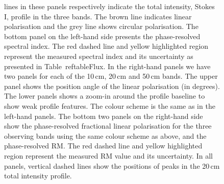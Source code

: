 \documentclass[useAMS,usenatbib]{mn2e}
\begin{document}
\begin{appendix}
\begin{figure}
\begin{center}
{lines in these panels respectively indicate the total intensity, Stokes I, profile in the three bands. 
The brown line indicates linear polarisation and the grey line shows circular polarisation. 
The bottom panel on the left-hand side presents the phase-resolved spectral index.   
The red dashed line and yellow highlighted region represent the measured spectral 
index and its uncertainty as presented in Table~ref{tableFlux}.
%
In the right-hand panels we have two panels for each of the 10\,cm, 20\,cm and 50\,cm bands. 
The upper panel shows the position angle of the linear polarisation (in degrees).
%
The lower panels shows a zoom-in around the profile baseline to show weak profile 
features. The colour scheme is the same as in the left-hand panels.   
%
The bottom two panels on the right-hand side show the phase-resolved fractional 
linear polarisation for the three observing bands using the same colour scheme as above, 
and the phase-resolved RM. The red dashed line and yellow highlighted region represent the 
measured RM value and its uncertainty. 
%
In all panels, vertical dashed lines show the positions of peaks in the 20\,cm total intensity profile.
}
\label{0437}
\end{center}
\end{figure}


\end{appendix}
\end{document}
